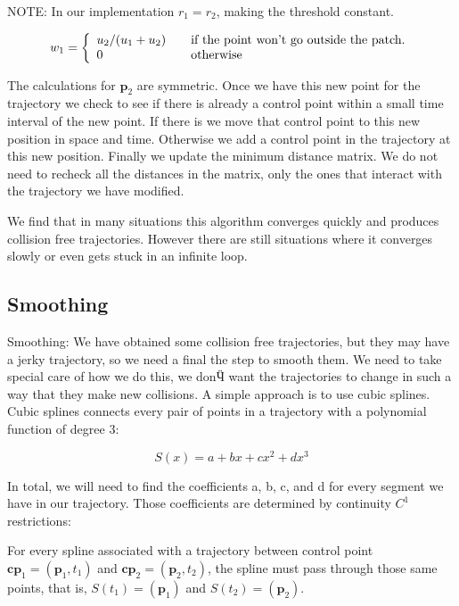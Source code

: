NOTE: In our implementation $r_1 = r_2$, making the threshold constant.

\begin{equation}
w_1 = \left\{
	\begin{array}{l l}
		u_2 / (u_1 + u_2)	&	\quad \text{if the point won't go outside the patch.}\\
		0								&	\quad \text{otherwise}
	\end{array}
	\right.
\end{equation}

The calculations for $\mathbf{p}_2$ are symmetric. Once we have this new point for the trajectory we check to see if there is already a control point within a small time interval of the new point. If there is we move that control point to this new position in space and time. Otherwise we add a control 
point in the trajectory at this new position. Finally we update the minimum distance matrix. We do not need to recheck all the distances in the matrix, only the ones that interact with the trajectory we have modified.

We find that in many situations this algorithm converges quickly and produces collision free trajectories. However there are still situations where it converges slowly or even gets stuck in an infinite loop.

\subsection{Smoothing}
\label{sec:method:smoothing}

Smoothing:
We have obtained some collision free trajectories, but they may have a jerky trajectory, so we need a final the step to smooth them. We need to take special care of how we do this, we donӴ want the trajectories to change in such a way that they make new collisions. A simple approach is to use cubic splines. Cubic splines connects every pair of points in a trajectory with a polynomial function of degree $3$:

\begin{equation}
 S(x)=a+bx+ cx^2+ dx^3
\end{equation}

In total, we will need to find the coefficients a, b, c, and d for every segment we have in our trajectory. Those coefficients are determined by continuity $C^1$ restrictions: 

For every spline associated with a trajectory between control point $\mathbf{cp}_1=(\mathbf{p}_1,t_1)$ and $\mathbf{cp}_2=(\mathbf{p}_2,t_2)$, the spline must pass through those same points, that is, $S(t_1)=(\mathbf{p}_1)$ and $S(t_2)=(\mathbf{p}_2)$.

